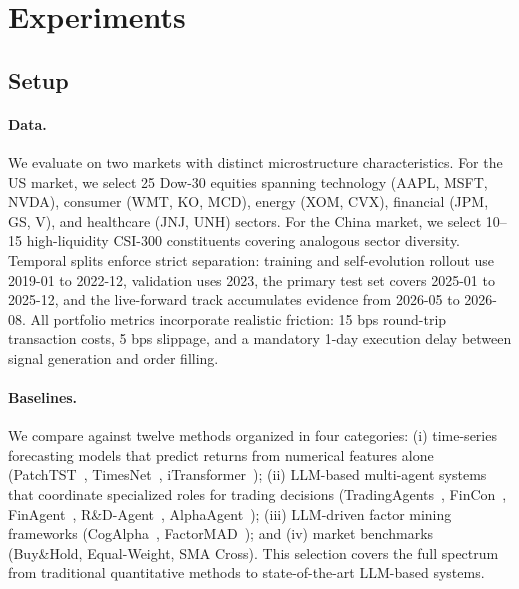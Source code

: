 \section{Experiments}
\label{sec:experiments}

\subsection{Setup}

\paragraph{Data.} We evaluate on two markets with distinct microstructure characteristics. For the US market, we select 25 Dow-30 equities spanning technology (AAPL, MSFT, NVDA), consumer (WMT, KO, MCD), energy (XOM, CVX), financial (JPM, GS, V), and healthcare (JNJ, UNH) sectors. For the China market, we select 10--15 high-liquidity CSI-300 constituents covering analogous sector diversity. Temporal splits enforce strict separation: training and self-evolution rollout use 2019-01 to 2022-12, validation uses 2023, the primary test set covers 2025-01 to 2025-12, and the live-forward track accumulates evidence from 2026-05 to 2026-08. All portfolio metrics incorporate realistic friction: 15 bps round-trip transaction costs, 5 bps slippage, and a mandatory 1-day execution delay between signal generation and order filling.

\paragraph{Baselines.} We compare against twelve methods organized in four categories: (i) time-series forecasting models that predict returns from numerical features alone (PatchTST~\cite{patchtst2023}, TimesNet~\cite{timesnet2023}, iTransformer~\cite{itransformer2024}); (ii) LLM-based multi-agent systems that coordinate specialized roles for trading decisions (TradingAgents~\cite{tradingagents2025}, FinCon~\cite{fincon2024}, FinAgent~\cite{finagent2024}, R\&D-Agent~\cite{rdagent2025}, AlphaAgent~\cite{alphaagent2025}); (iii) LLM-driven factor mining frameworks (CogAlpha~\cite{cogalpha2025}, FactorMAD~\cite{factormad2025}); and (iv) market benchmarks (Buy\&Hold, Equal-Weight, SMA Cross). This selection covers the full spectrum from traditional quantitative methods to state-of-the-art LLM-based systems.

